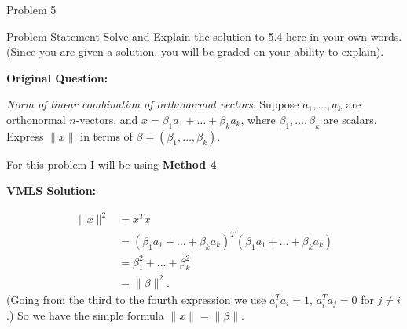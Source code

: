 \begin{problem}{Problem 5}
    \begin{statement}{Problem Statement}
        Solve and Explain the solution to 5.4 here in your own words. (Since you are given a solution, you will be graded on your ability to explain). \vspace*{1em}

        \textbf{Original Question:} \vspace*{1em}

        \textit{Norm of linear combination of orthonormal vectors}. Suppose $a_{1}, \dots , a_{k}$ are orthonormal $n$-vectors, and $x = \beta_{1}a_{1} + \dots + \beta_{k}a_{k}$, where $\beta_{1}, 
        \dots , \beta_{k}$ are scalars. Express $\| x \|$ in terms of $\beta = (\beta_{1}, \dots , \beta_{k})$.
    \end{statement}

    \begin{highlight}[Solution]
        For this problem I will be using \textbf{Method 4}. \vspace*{1em}

        \textbf{VMLS Solution:}

        \begin{align*}
            \| x \|^{2} & = x^{T}x \\
            & = (\beta_{1}a_{1} + \dots + \beta_{k}a_{k})^{T}(\beta_{1}a_{1} + \dots + \beta_{k}a_{k}) \\
            & = \beta_{1}^{2} + \dots + \beta_{k}^{2} \\
            & = \| \beta \|^{2}.
        \end{align*}
        (Going from the third to the fourth expression we use $a_{i}^{T}a_{i} = 1$, $a_{i}^{T}a_{j} = 0$ for $j \neq i$.) So we have the simple formula $\|x\| = \|\beta\|$.
    \end{highlight}
\end{problem}

